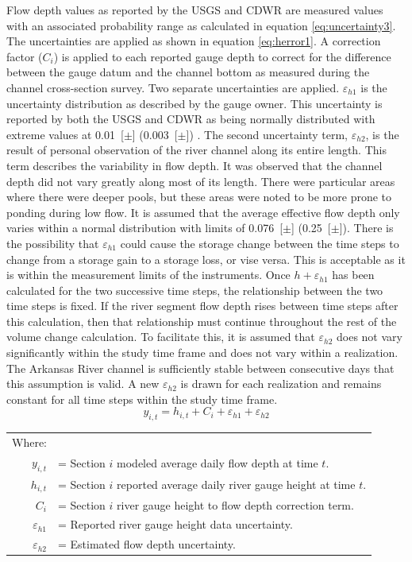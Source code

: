 \begin{linenumbers}
Flow depth values as reported by the USGS and CDWR are measured values with an associated probability range as calculated in equation \ref{eq:uncertainty3}.  The uncertainties are applied as shown in equation \ref{eq:herror1}.  A correction factor ($ C_{i} $) is applied to each reported gauge depth to correct for the difference between the gauge datum and the channel bottom as measured during the channel cross-section survey.  Two separate uncertainties are applied.  $ \varepsilon_{h1} $ is the uncertainty distribution as described by the gauge owner.  This uncertainty is reported by both the USGS and CDWR as being normally distributed with extreme values at \SI{0.01}[$\pm$]{\foot} (\SI{0.003}[$ \pm $]{\meter}) \parencite{USGSPL89}.  The second uncertainty term, $ \varepsilon_{h2} $, is the result of personal observation of the river channel along its entire length.  This term describes the variability in flow depth.  It was observed that the channel depth did not vary greatly along most of its length.  There were particular areas where there were deeper pools, but these areas were noted to be more prone to ponding during low flow.  It is assumed that the average effective flow depth only varies within a normal distribution with limits of \SI{0.076}[$ \pm $]{\meter} (\SI{0.25}[$ \pm $]{\foot}).  There is the possibility that $\varepsilon_{h1}$ could cause the storage change between the time steps to change from a storage gain to a storage loss, or vise versa.  This is acceptable as it is within the measurement limits of the instruments.  Once $h+\varepsilon_{h1}$ has been calculated for the two successive time steps, the relationship between the two time steps is fixed.  If the river segment flow depth rises between time steps after this calculation, then that relationship must continue throughout the rest of the volume change calculation.  To facilitate this, it is assumed that $\varepsilon_{h2}$ does not vary significantly within the study time frame and does not vary within a realization.  The Arkansas River channel is sufficiently stable between consecutive days that this assumption is valid.  A new $\varepsilon_{h2}$ is drawn for each realization and remains constant for all time steps within the study time frame.
\begin{equation}
	y_{i,t}=h_{i,t}+C_{i}+\varepsilon_{h1}+\varepsilon_{h2}
	\label{eq:herror1}
\end{equation}
\begin{tabular}{rl}
	Where: & \\
	$y_{i,t}$  & = Section $ i $ modeled average daily flow depth at time $ t $.\\
	$h_{i,t}$  & = Section $ i $ reported average daily river gauge height at time $ t $.\\
	$ C_{i} $ & = Section $ i $ river gauge height to flow depth correction term.\\
	$\varepsilon_{h1}$ & = Reported river gauge height data uncertainty.\\
	$\varepsilon_{h2}$ & = Estimated flow depth uncertainty.\\
\end{tabular}\\


\end{linenumbers}
